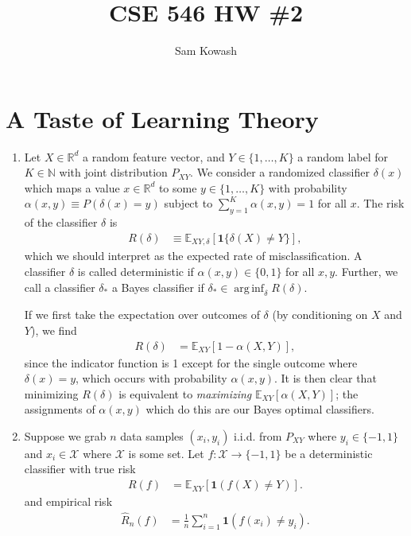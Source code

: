 \documentclass[11pt,letterpaper]{article}
\author{Sam Kowash}
\title{CSE 546 HW \#2}
\DeclareMathOperator*{\arginf}{arg\,inf}
\numberwithin{equation}{section}
\numberwithin{figure}{section}
\begin{document}
\maketitle
\section{A Taste of Learning Theory}
\begin{enumerate}
	\item Let $X \in \mathbb{R}^d$ a random feature vector, and $Y \in \{1,\ldots,K\}$ a random label for $K\in \mathbb{N}$ with joint distribution $P_{XY}$. We consider a randomized classifier $\delta(x)$ which maps a value $x\in\mathbb{R}^d$ to some $y \in \{1,\ldots,K\}$ with probability $\alpha(x,y) \equiv P(\delta(x)=y)$ subject to $\sum_{y=1}^K \alpha(x,y) = 1$ for all $x$. The risk of the classifier $\delta$ is
	\begin{align*}
		R(\delta) &\equiv \mathbb{E}_{XY,\delta}\left[\bm{1}\{\delta(X) \neq Y\}\right],
	\end{align*}
	which we should interpret as the expected rate of misclassification. A classifier $\delta$ is called deterministic if $\alpha(x,y) \in \{0,1\}$ for all $x,y$. Further, we call a classifier $\delta_\ast$ a Bayes classifier if $\delta_\ast \in \arginf_\delta R(\delta)$.

	If we first take the expectation over outcomes of $\delta$ (by conditioning on $X$ and $Y$), we find
	\begin{align*}
		R(\delta) &= \mathbb{E}_{XY}\left[1-\alpha(X,Y)\right],
	\end{align*}
	since the indicator function is 1 except for the single outcome where $\delta(x)=y$, which occurs with probability $\alpha(x,y)$. It is then clear that minimizing $R(\delta)$ is equivalent to \emph{maximizing} $\mathbb{E}_{XY}[\alpha(X,Y)]$; the assignments of $\alpha(x,y)$ which do this are our Bayes optimal classifiers. 

















	\item Suppose we grab $n$ data samples $(x_i,y_i)$ i.i.d. from $P_{XY}$ where $y_i \in \{-1,1\}$ and $x_i \in \mathcal{X}$ where $\mathcal{X}$ is some set. Let $f: \mathcal{X} \to \{-1,1\}$ be a deterministic classifier with true risk
	\begin{align*}
		R(f) &= \mathbb{E}_{XY}\left[\bm{1}(f(X) \neq Y)\right].
	\end{align*}
	and empirical risk
	\begin{align*}
		\hat{R}_n(f) &= \frac{1}{n} \sum_{i=1}^n \bm{1}(f(x_i) \neq y_i).
	\end{align*}





\end{enumerate}
\end{document}
